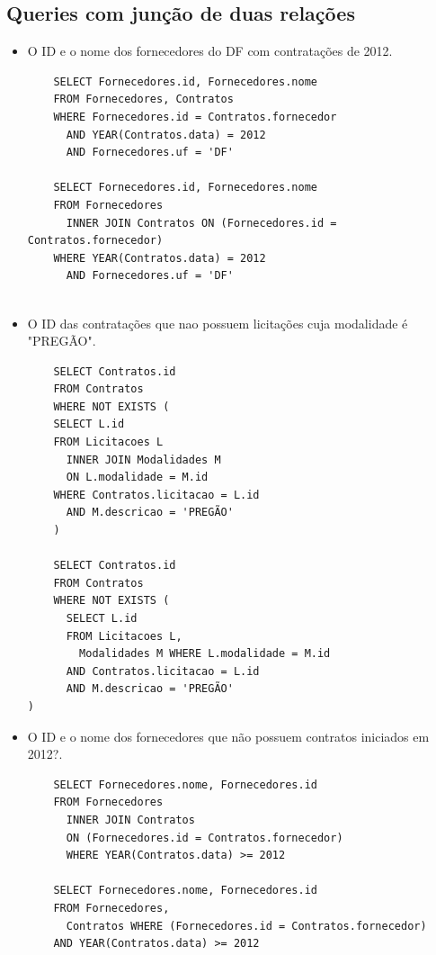 \documentclass{article}
\begin{document}
\subsection{Queries com junção de duas relações}
\begin{itemize}
\item O ID e o nome dos fornecedores do DF com contratações de 2012.
  \begin{verbatim}
    SELECT Fornecedores.id, Fornecedores.nome
    FROM Fornecedores, Contratos 
    WHERE Fornecedores.id = Contratos.fornecedor
      AND YEAR(Contratos.data) = 2012
      AND Fornecedores.uf = 'DF'

    SELECT Fornecedores.id, Fornecedores.nome
    FROM Fornecedores
      INNER JOIN Contratos ON (Fornecedores.id = Contratos.fornecedor)
    WHERE YEAR(Contratos.data) = 2012
      AND Fornecedores.uf = 'DF'
  
\end{verbatim}  
\item O ID das contratações que nao possuem licitações cuja modalidade é "PREGÃO".
  \begin{verbatim}
    SELECT Contratos.id
    FROM Contratos
    WHERE NOT EXISTS (
    SELECT L.id
    FROM Licitacoes L
      INNER JOIN Modalidades M
      ON L.modalidade = M.id
    WHERE Contratos.licitacao = L.id
      AND M.descricao = 'PREGÃO'
    )
      
    SELECT Contratos.id
    FROM Contratos
    WHERE NOT EXISTS (
      SELECT L.id
      FROM Licitacoes L, 
        Modalidades M WHERE L.modalidade = M.id
      AND Contratos.licitacao = L.id
      AND M.descricao = 'PREGÃO'
)

  \end{verbatim}
  \pagebreak
\item O ID e o nome dos fornecedores que não possuem contratos iniciados em 2012?.
  \begin{verbatim}
    SELECT Fornecedores.nome, Fornecedores.id
    FROM Fornecedores
      INNER JOIN Contratos
      ON (Fornecedores.id = Contratos.fornecedor)
      WHERE YEAR(Contratos.data) >= 2012

    SELECT Fornecedores.nome, Fornecedores.id
    FROM Fornecedores,
      Contratos WHERE (Fornecedores.id = Contratos.fornecedor)
    AND YEAR(Contratos.data) >= 2012 
      
\end{verbatim}  
    
\end{itemize}
\end{document}
